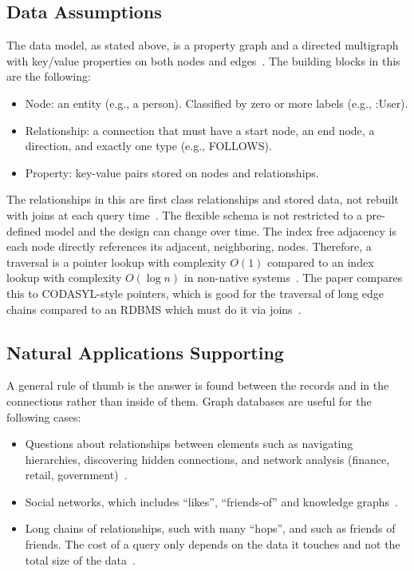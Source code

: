 \documentclass[11pt,a4paper]{article}
\begin{document}
\subsection{Data Assumptions}

The data model, as stated above, is a property graph and a directed multigraph with key/value properties on both nodes and edges~\cite{neo4j2026graphdb,stonebraker2024whatgoesaround}. The building blocks in this are the following:

\begin{itemize}
  \item Node: an entity (e.g., a person). Classified by zero or more labels (e.g., :User).
  \item Relationship: a connection that must have a start node, an end node, a direction, and exactly one type (e.g., FOLLOWS).
  \item Property: key-value pairs stored on nodes and relationships.
\end{itemize}

The relationships in this are first class relationships and stored data, not rebuilt with joins at each query time~\cite{dbdb2026neo4j}. The flexible schema is not restricted to a pre-defined model and the design can change over time. The index free adjacency is each node directly references its adjacent, neighboring, nodes. Therefore, a traversal is a pointer lookup with complexity $O(1)$ compared to an index lookup with complexity $O(\log n)$ in non-native systems~\cite{stegeman2023native}. The paper compares this to CODASYL-style pointers, which is good for the traversal of long edge chains compared to an RDBMS which must do it via joins~\cite{stonebraker2024whatgoesaround}.

\subsection{Natural Applications Supporting}

A general rule of thumb is the answer is found between the records and in the connections rather than inside of them. Graph databases are useful for the following cases:

\begin{itemize}
  \item Questions about relationships between elements such as navigating hierarchies, discovering hidden connections, and network analysis (finance, retail, government)~\cite{neo4j2026graphdb}.
  \item Social networks, which includes ``likes'', ``friends-of'' and knowledge graphs~\cite{stonebraker2024whatgoesaround}.
  \item Long chains of relationships, such with many ``hops'', and such as friends of friends. The cost of a query only depends on the data it touches and not the total size of the data~\cite{stegeman2023native}.
\end{itemize}
\end{document}
